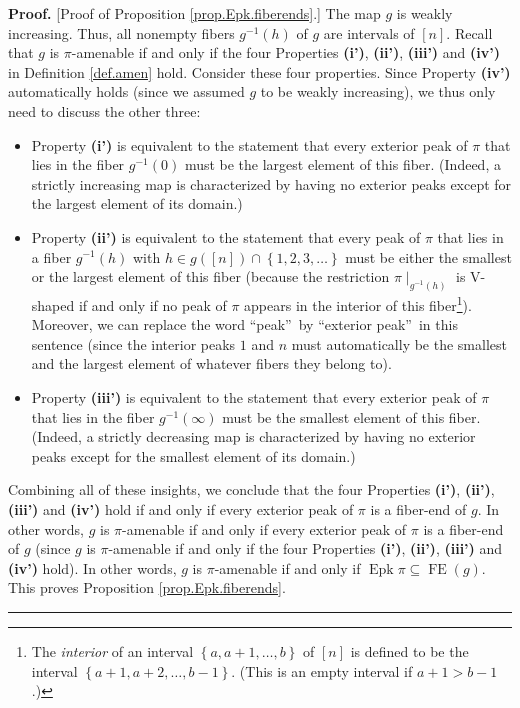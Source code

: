 \documentclass[numbers=enddot,12pt,final,onecolumn,notitlepage]{scrartcl}%
\theoremstyle{definition}
\newenvironment{proof}[1][Proof]{\noindent\textbf{#1.} }{\ \rule{0.5em}{0.5em}}
\begin{document}
\begin{proof}
[Proof of Proposition \ref{prop.Epk.fiberends}.] The map $g$ is weakly
increasing. Thus, all nonempty fibers $g^{-1}\left(  h\right)  $ of $g$ are
intervals of $\left[  n\right]  $. Recall that $g$ is $\pi$-amenable if and
only if the four Properties \textbf{(i')}, \textbf{(ii')}, \textbf{(iii')} and
\textbf{(iv')} in Definition \ref{def.amen} hold. Consider these four
properties. Since Property \textbf{(iv')} automatically holds (since we
assumed $g$ to be weakly increasing), we thus only need to discuss the other three:

\begin{itemize}
\item Property \textbf{(i')} is equivalent to the statement that every
exterior peak of $\pi$ that lies in the fiber $g^{-1}\left(  0\right)  $ must
be the largest element of this fiber. (Indeed, a strictly increasing map is
characterized by having no exterior peaks except for the largest element
of its domain.)

\item Property \textbf{(ii')} is equivalent to the statement that every peak
of $\pi$ that lies in a fiber $g^{-1}\left(  h\right)  $ with $h\in g\left(
\left[  n\right]  \right)  \cap\left\{  1,2,3,\ldots\right\}  $ must be either
the smallest or the largest element of this fiber (because the restriction
$\pi\mid_{g^{-1}\left(  h\right)  }$ is V-shaped if and only if no peak of
$\pi$ appears in the interior of this fiber\footnote{The \textit{interior} of
an interval $\left\{  a,a+1,\ldots,b\right\}  $ of $\left[  n\right]  $ is
defined to be the interval $\left\{  a+1,a+2,\ldots,b-1\right\}  $. (This is
an empty interval if $a+1>b-1$.)}). Moreover, we can replace the word
\textquotedblleft peak\textquotedblright\ by \textquotedblleft exterior
peak\textquotedblright\ in this sentence (since the interior peaks $1$ and $n$
must automatically be the smallest and the largest element of whatever fibers
they belong to).

\item Property \textbf{(iii')} is equivalent to the statement that every
exterior peak of $\pi$ that lies in the fiber $g^{-1}\left(  \infty\right)  $
must be the smallest element of this fiber. (Indeed, a strictly decreasing map
is characterized by having no exterior peaks except for the smallest element
of its domain.)
\end{itemize}

Combining all of these insights, we conclude that the four Properties
\textbf{(i')}, \textbf{(ii')}, \textbf{(iii')} and \textbf{(iv')} hold if and
only if every exterior peak of $\pi$ is a fiber-end of $g$. In other words,
$g$ is $\pi$-amenable if and only if every exterior peak of $\pi$ is a
fiber-end of $g$ (since $g$ is $\pi$-amenable if and only if the four
Properties \textbf{(i')}, \textbf{(ii')}, \textbf{(iii')} and \textbf{(iv')}
hold). In other words, $g$ is $\pi$-amenable if and only if
$\operatorname*{Epk}\pi\subseteq\operatorname*{FE}\left(  g\right)  $. This
proves Proposition \ref{prop.Epk.fiberends}.
\end{proof}
\end{document}
